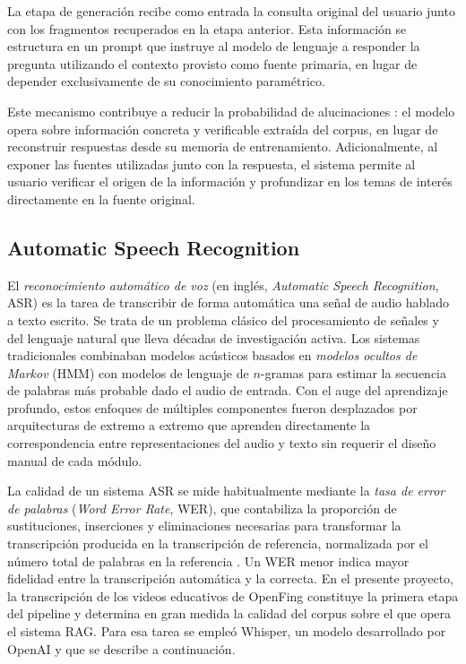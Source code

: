 La etapa de generación recibe como entrada la consulta original del usuario junto con los fragmentos recuperados en la etapa anterior. Esta información se estructura en un prompt que instruye al modelo de lenguaje a responder la pregunta utilizando el contexto provisto como fuente primaria, en lugar de depender exclusivamente de su conocimiento paramétrico.

Este mecanismo contribuye a reducir la probabilidad de alucinaciones \cite{lewis2020retrieval}: el modelo opera sobre información concreta y verificable extraída del corpus, en lugar de reconstruir respuestas desde su memoria de entrenamiento. Adicionalmente, al exponer las fuentes utilizadas junto con la respuesta, el sistema permite al usuario verificar el origen de la información y profundizar en los temas de interés directamente en la fuente original.


\subsection{Automatic Speech Recognition}
\label{subsection:2-Automatic Speach Recognition}

El \textit{reconocimiento automático de voz} (en inglés, \textit{Automatic Speech Recognition}, ASR) es la tarea de transcribir de forma automática una señal de audio hablado a texto escrito. Se trata de un problema clásico del procesamiento de señales y del lenguaje natural que lleva décadas de investigación activa. Los sistemas tradicionales combinaban modelos acústicos basados en \textit{modelos ocultos de Markov} (HMM) con modelos de lenguaje de $n$-gramas para estimar la secuencia de palabras más probable dado el audio de entrada. Con el auge del aprendizaje profundo, estos enfoques de múltiples componentes fueron desplazados por arquitecturas de extremo a extremo que aprenden directamente la correspondencia entre representaciones del audio y texto sin requerir el diseño manual de cada módulo.

La calidad de un sistema ASR se mide habitualmente mediante la \textit{tasa de error de palabras} (\textit{Word Error Rate}, WER), que contabiliza la proporción de sustituciones, inserciones y eliminaciones necesarias para transformar la transcripción producida en la transcripción de referencia, normalizada por el número total de palabras en la referencia \cite{ASR_Accuracy}. Un WER menor indica mayor fidelidad entre la transcripción automática y la correcta. En el presente proyecto, la transcripción de los videos educativos de OpenFing constituye la primera etapa del pipeline y determina en gran medida la calidad del corpus sobre el que opera el sistema RAG. Para esa tarea se empleó Whisper, un modelo desarrollado por OpenAI y que se describe a continuación.

